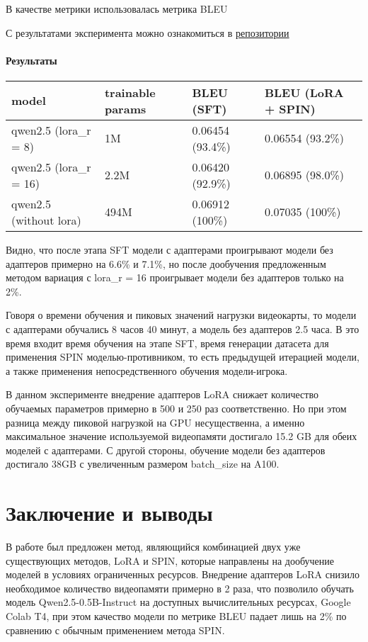 \documentclass[12pt, twoside]{article}
\begin{document}
В качестве метрики использовалась метрика BLEU

С результатами эксперимента можно ознакомиться в \href{https://github.com/intsystems/2025-Project-178}{репозитории}

\paragraph{Результаты}

\vspace{10}

\begin{tabular}{l|l|l|l|}
model                  & trainable params & BLEU (SFT)       & BLEU (LoRA + SPIN) \\ \hline
qwen2.5 (lora\_r = 8)  & 1M               & 0.06454 (93.4\%) & 0.06554 (93.2\%)   \\ \hline
qwen2.5 (lora\_r = 16) & 2.2M             & 0.06420 (92.9\%) & 0.06895 (98.0\%)   \\ \hline
qwen2.5 (without lora) & 494M             & 0.06912 (100\%)  & 0.07035 (100\%)    \\ \hline
\end{tabular}

\vspace{10}

Видно, что после этапа SFT модели с адаптерами проигрывают модели без адаптеров примерно на 6.6\% и 7.1\%, но после дообучения предложенным методом вариация с lora\_r = 16 проигрывает модели без адаптеров только на 2\%.

Говоря о времени обучения и пиковых значений нагрузки видеокарты, то модели с адаптерами обучались 8 часов 40 минут, а модель без адаптеров 2.5 часа. В это время входит время обучения на этапе SFT, время генерации датасета для применения SPIN моделью-противником, то есть предыдущей итерацией модели, а также применения непосредственного обучения модели-игрока.

В данном эксперименте внедрение адаптеров LoRA снижает количество обучаемых параметров примерно в 500 и 250 раз соответственно. Но при этом разница между пиковой нагрузкой на GPU несущественна, а именно максимальное значение используемой видеопамяти достигало 15.2 GB для обеих моделей с адаптерами. С другой стороны, обучение модели без адаптеров достигало 38GB с увеличенным размером batch\_size на A100.

\section{Заключение и выводы}

В работе был предложен метод, являющийся комбинацией двух уже существующих методов, LoRA и SPIN, которые направлены на дообучение моделей в условиях ограниченных ресурсов. Внедрение адаптеров LoRA снизило необходимое количество видеопамяти примерно в 2 раза, что позволило обучать модель Qwen2.5-0.5B-Instruct на доступных вычислительных ресурсах, Google Colab T4, при этом качество модели по метрике BLEU падает лишь на 2\% по сравнению с обычным применением метода SPIN.


\printbibliography
\end{document}
